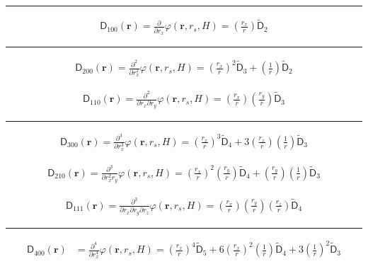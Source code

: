 \noindent\rule{6cm}{0.4pt}
\begin{align}
  \mathsf{D}_{100}(\mathbf{r}) = \frac{\partial}{\partial r_x} \varphi (\mathbf{r}, r_s, H) =
    \left(\frac{r_x}{r}\right) \mathsf{\tilde{D}}_{2} \nonumber
\end{align}

\noindent\rule{6cm}{0.4pt}
\begin{align}
\mathsf{D}_{200}(\mathbf{r}) = \frac{\partial^2}{\partial r_x^2} \varphi (\mathbf{r}, r_s, H) = 
\left(\frac{r_x}{r}\right)^2 \mathsf{\tilde{D}}_{3} + \left(\frac{1}{r}\right)\mathsf{\tilde{D}}_{2}\nonumber
\end{align}

\begin{align}
\mathsf{D}_{110}(\mathbf{r}) = \frac{\partial^2}{\partial r_x\partial r_y} \varphi (\mathbf{r}, r_s, H) =
\left(\frac{r_x}{r}\right) \left(\frac{r_y}{r}\right)  \mathsf{\tilde{D}}_{3} \nonumber
\end{align}

\noindent\rule{6cm}{0.4pt}
\begin{align}
\mathsf{D}_{300}(\mathbf{r}) = \frac{\partial^3}{\partial r_x^3} \varphi (\mathbf{r}, r_s, H) = 
  \left(\frac{r_x}{r}\right)^3 \mathsf{\tilde{D}}_{4}
  + 3 \left(\frac{r_x}{r}\right) \left(\frac{1}{r}\right) \mathsf{\tilde{D}}_{3} \nonumber
\end{align}

\begin{align}
\mathsf{D}_{210}(\mathbf{r}) = \frac{\partial^3}{\partial r_x^2 r_y} \varphi (\mathbf{r}, r_s, H) = 
  \left(\frac{r_x}{r}\right)^2 \left(\frac{r_y}{r}\right) \mathsf{\tilde{D}}_{4} + \left(\frac{r_y}{r}\right) \left(\frac{1}{r}\right) \mathsf{\tilde{D}}_{3} \nonumber
\end{align}

\begin{align}
\mathsf{D}_{111}(\mathbf{r}) = \frac{\partial^3}{\partial r_x\partial r_y\partial r_z} \varphi (\mathbf{r}, r_s, H) = 
\left(\frac{r_x}{r}\right)\left(\frac{r_y}{r}\right)\left(\frac{r_z}{r}\right) \mathsf{\tilde{D}}_{4} \nonumber
\end{align}

\noindent\rule{6cm}{0.4pt}
\begin{align}
  \mathsf{D}_{400}(\mathbf{r}) &= \frac{\partial^4}{\partial r_x^4}
  \varphi (\mathbf{r}, r_s, H) =
  \left(\frac{r_x}{r}\right)^4 \mathsf{\tilde{D}}_{5}+
  6\left(\frac{r_x}{r}\right)^2 \left(\frac{1}{r}\right) \mathsf{\tilde{D}}_{4} +
  3 \left(\frac{1}{r}\right)^2 \mathsf{\tilde{D}}_{3}
  \nonumber
\end{align}

